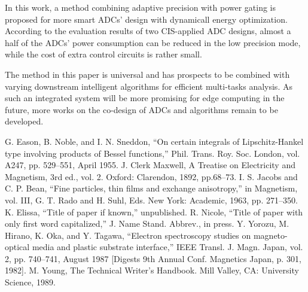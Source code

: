 \documentclass[conference]{IEEEtran}
\begin{document}
In this work, a method combining adaptive precision with power gating is proposed for more smart ADCs' design with dynamicall energy optimization. According to the evaluation results of two CIS-applied ADC designs, almost a half of the ADCs’ power consumption can be reduced in the low precision mode, while the cost of extra control circuits is rather small.

 The method in this paper is universal and has prospects to be combined with varying downstream intelligent algorithms for efficient multi-tasks analysis. As such an integrated system will be more promising for edge computing in the future, more works on the co-design of ADCs and algorithms remain to be developed.

\begin{thebibliography}{00}
 G. Eason, B. Noble, and I. N. Sneddon, ``On certain integrals of Lipschitz-Hankel type involving products of Bessel functions,'' Phil. Trans. Roy. Soc. London, vol. A247, pp. 529--551, April 1955.
 J. Clerk Maxwell, A Treatise on Electricity and Magnetism, 3rd ed., vol. 2. Oxford: Clarendon, 1892, pp.68--73.
 I. S. Jacobs and C. P. Bean, ``Fine particles, thin films and exchange anisotropy,'' in Magnetism, vol. III, G. T. Rado and H. Suhl, Eds. New York: Academic, 1963, pp. 271--350.
 K. Elissa, ``Title of paper if known,'' unpublished.
 R. Nicole, ``Title of paper with only first word capitalized,'' J. Name Stand. Abbrev., in press.
 Y. Yorozu, M. Hirano, K. Oka, and Y. Tagawa, ``Electron spectroscopy studies on magneto-optical media and plastic substrate interface,'' IEEE Transl. J. Magn. Japan, vol. 2, pp. 740--741, August 1987 [Digests 9th Annual Conf. Magnetics Japan, p. 301, 1982].
 M. Young, The Technical Writer's Handbook. Mill Valley, CA: University Science, 1989.
\end{thebibliography}
\end{document}
